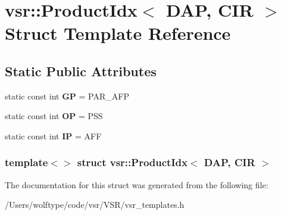 \hypertarget{structvsr_1_1_product_idx_3_01_d_a_p_00_01_c_i_r_01_4}{\section{vsr\-:\-:Product\-Idx$<$ D\-A\-P, C\-I\-R $>$ Struct Template Reference}
\label{structvsr_1_1_product_idx_3_01_d_a_p_00_01_c_i_r_01_4}
}
\subsection*{Static Public Attributes}
\begin{DoxyCompactItemize}
\item 
\hypertarget{structvsr_1_1_product_idx_3_01_d_a_p_00_01_c_i_r_01_4_af31ca4def9162f80db07f1d11d096527}{static const int {\bfseries G\-P} = P\-A\-R\-\_\-\-A\-F\-P}\label{structvsr_1_1_product_idx_3_01_d_a_p_00_01_c_i_r_01_4_af31ca4def9162f80db07f1d11d096527}

\item 
\hypertarget{structvsr_1_1_product_idx_3_01_d_a_p_00_01_c_i_r_01_4_abfb0376b294454d2f5b93acb86a5bc52}{static const int {\bfseries O\-P} = P\-S\-S}\label{structvsr_1_1_product_idx_3_01_d_a_p_00_01_c_i_r_01_4_abfb0376b294454d2f5b93acb86a5bc52}

\item 
\hypertarget{structvsr_1_1_product_idx_3_01_d_a_p_00_01_c_i_r_01_4_a952df401c8b68678ba32c2565282604e}{static const int {\bfseries I\-P} = A\-F\-F}\label{structvsr_1_1_product_idx_3_01_d_a_p_00_01_c_i_r_01_4_a952df401c8b68678ba32c2565282604e}

\end{DoxyCompactItemize}
\subsubsection*{template$<$$>$ struct vsr\-::\-Product\-Idx$<$ D\-A\-P, C\-I\-R $>$}



The documentation for this struct was generated from the following file\-:\begin{DoxyCompactItemize}
\item 
/\-Users/wolftype/code/vsr/\-V\-S\-R/vsr\-\_\-templates.\-h\end{DoxyCompactItemize}

